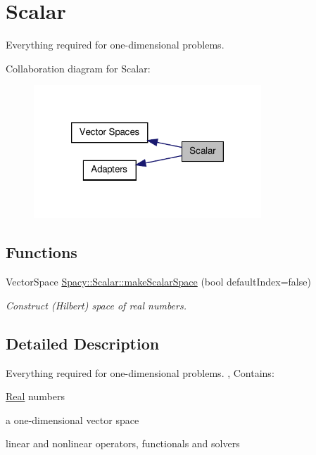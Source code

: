 \hypertarget{group__ScalarGroup}{\section{\-Scalar}
\label{group__ScalarGroup}
}


\-Everything required for one-\/dimensional problems.  


\-Collaboration diagram for \-Scalar\-:
\nopagebreak
\begin{figure}[H]
\begin{center}
\leavevmode
\includegraphics[width=242pt]{group__ScalarGroup}
\end{center}
\end{figure}
\subsection*{\-Functions}
\begin{DoxyCompactItemize}
\item 
\-Vector\-Space \hyperlink{group__ScalarGroup_gaddea78d9bf47f78eedce719c2776d2d4}{\-Spacy\-::\-Scalar\-::make\-Scalar\-Space} (bool default\-Index=false)
\begin{DoxyCompactList}\small\item\em \-Construct (\-Hilbert) space of real numbers. \end{DoxyCompactList}\end{DoxyCompactItemize}


\subsection{\-Detailed \-Description}
\-Everything required for one-\/dimensional problems. , \-Contains\-:
\begin{DoxyItemize}
\item \hyperlink{classSpacy_1_1Real}{\-Real} numbers
\item a one-\/dimensional vector space
\item linear and nonlinear operators, functionals and solvers 
\end{DoxyItemize}

